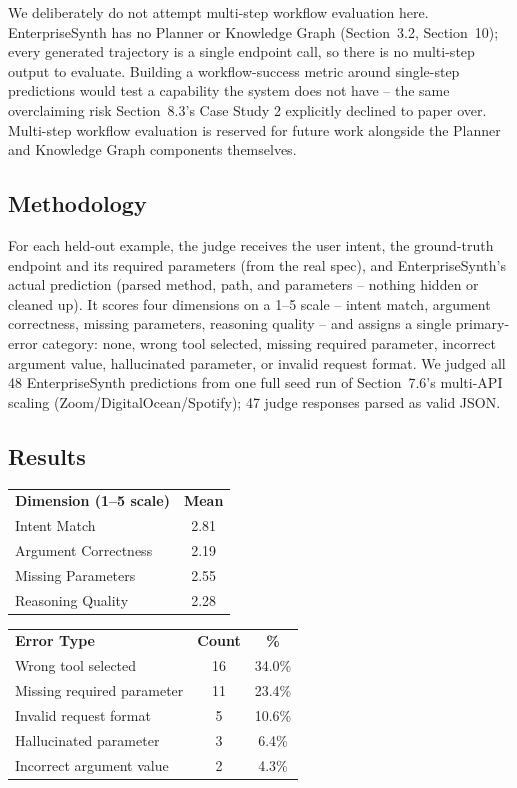 \documentclass[11pt]{article}
\begin{document}
We deliberately do not attempt multi-step workflow evaluation here. EnterpriseSynth has no
Planner or Knowledge Graph (Section~3.2, Section~10); every generated trajectory is a single
endpoint call, so there is no multi-step output to evaluate. Building a workflow-success metric
around single-step predictions would test a capability the system does not have -- the same
overclaiming risk Section~8.3's Case Study 2 explicitly declined to paper over. Multi-step
workflow evaluation is reserved for future work alongside the Planner and Knowledge Graph
components themselves.

\subsection{Methodology}
For each held-out example, the judge receives the user intent, the ground-truth endpoint and its
required parameters (from the real spec), and EnterpriseSynth's actual prediction (parsed method,
path, and parameters -- nothing hidden or cleaned up). It scores four dimensions on a 1--5 scale
-- intent match, argument correctness, missing parameters, reasoning quality -- and assigns a
single primary-error category: none, wrong tool selected, missing required parameter, incorrect
argument value, hallucinated parameter, or invalid request format. We judged all 48
EnterpriseSynth predictions from one full seed run of Section~7.6's multi-API scaling
(Zoom/DigitalOcean/Spotify); 47 judge responses parsed as valid JSON.

\subsection{Results}

\begin{center}
\small
\begin{tabular}{lc}
\textbf{Dimension (1--5 scale)} & \textbf{Mean} \\
Intent Match & 2.81 \\
Argument Correctness & 2.19 \\
Missing Parameters & 2.55 \\
Reasoning Quality & 2.28 \\
\end{tabular}
\end{center}

\begin{center}
\small
\begin{tabular}{lcc}
\textbf{Error Type} & \textbf{Count} & \textbf{\%} \\
Wrong tool selected & 16 & 34.0\% \\
Missing required parameter & 11 & 23.4\% \\
Invalid request format & 5 & 10.6\% \\
Hallucinated parameter & 3 & 6.4\% \\
Incorrect argument value & 2 & 4.3\% \\
\end{tabular}
\end{center}
\end{document}
